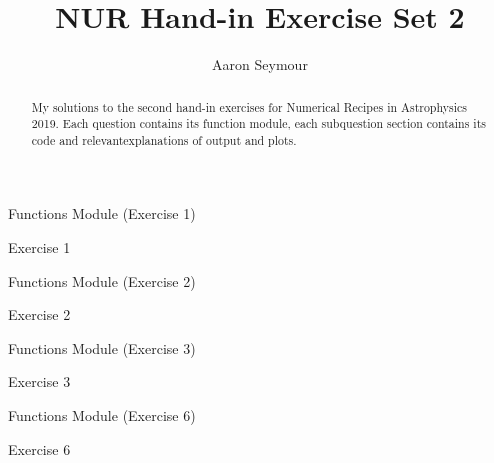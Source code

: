 \documentclass[a4paper,10pt]{article}
\title{NUR Hand-in Exercise Set 2}
\author{Aaron Seymour}
\begin{document}
\maketitle

\begin{abstract}
 My solutions to the second hand-in exercises for Numerical Recipes in Astrophysics 2019. Each question contains its function module, each subquestion section contains its code and relevantexplanations of output and plots.
\end{abstract}


\begin{section}{Functions Module (Exercise 1)}

\end{section}


\begin{section}{Exercise 1}

\end{section}

\begin{section}{Functions Module (Exercise 2)}

\end{section}


\begin{section}{Exercise 2}

\end{section}


\FloatBarrier
\begin{section}{Functions Module (Exercise 3)}

\end{section}

\begin{section}{Exercise 3}

\end{section}


\FloatBarrier
\begin{section}{Functions Module (Exercise 6)}

\end{section}

\begin{section}{Exercise 6}

\end{section}
  
\end{document}
